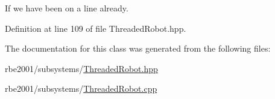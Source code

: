 If we have been on a line already. 



Definition at line 109 of file Threaded\+Robot.\+hpp.



The documentation for this class was generated from the following files\+:\begin{DoxyCompactItemize}
\item 
rbe2001/subsystems/\hyperlink{_threaded_robot_8hpp}{Threaded\+Robot.\+hpp}\item 
rbe2001/subsystems/\hyperlink{_threaded_robot_8cpp}{Threaded\+Robot.\+cpp}\end{DoxyCompactItemize}
